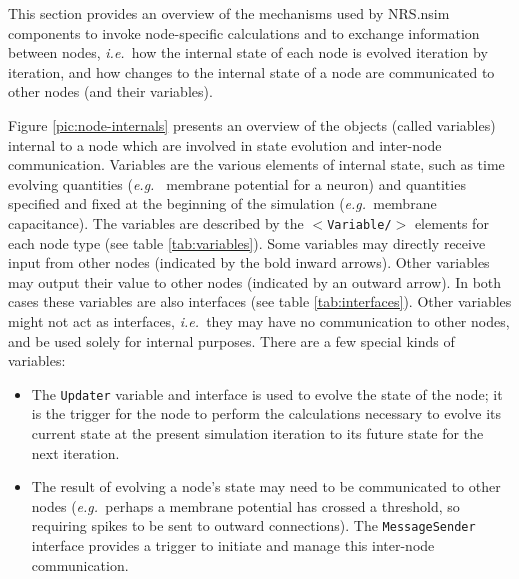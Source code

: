 \documentclass[pdftex,a4paper]{article}
\newif\ifpdf
\newcommand{\ie}{{\em i.e.\ }}
\newcommand{\eg}{{\em e.g.\ }}
\newcommand{\XML}[2][]{{\tt \small $<$#2#1/$>$}}
\begin{document}
This section provides an overview of the mechanisms used by NRS.nsim
components to invoke node-specific calculations and to exchange
information between nodes, \ie how the internal state of each node is
evolved iteration by iteration, and how changes to the internal state of
a node are communicated to other nodes (and their variables).

\ifpdf
\begin{figure}[htb]
  \begin{center}
    \texttt{[image: node-internals.pdf]}
    \caption{A node is essentially a collection of objects (called
    variables). This figure presents an internal view of a node, to
    illustrate those variables which play a significant role in the
    exchange of data between node elements. Those variables attached
    to bold arrows serve as interfaces to other nodes.}
    \label{pic:node-internals}
  \end{center}
\end{figure}
\fi


Figure \ref{pic:node-internals} presents an overview of the objects
(called variables) internal to a node which are involved in state
evolution and inter-node communication. Variables are the various
elements of internal state, such as time evolving quantities (\eg
membrane potential for a neuron) and quantities specified and fixed at
the beginning of the simulation (\eg membrane capacitance). The
variables are described by the \XML{Variable} elements for each node
type (see table \ref{tab:variables}). Some variables may directly
receive input from other nodes (indicated by the bold inward
arrows). Other variables may output their value to other nodes
(indicated by an outward arrow). In both cases these variables are
also interfaces (see table \ref{tab:interfaces}). Other variables
might not act as interfaces, \ie they may have no communication to
other nodes, and be used solely for internal purposes. There are a few
special kinds of variables:

\begin{itemize}

\item The {\tt Updater} variable and interface is used to evolve the
  state of the node; it is the trigger for the node to perform the
  calculations necessary to evolve its current state at the present
  simulation iteration to its future state for the next iteration.

\item The result of evolving a node's state may need to be communicated
  to other nodes (\eg perhaps a membrane potential has crossed a
  threshold, so requiring spikes to be sent to outward connections). The
  {\tt MessageSender} interface provides a trigger to initiate and
  manage this inter-node communication.

\end{itemize}
\end{document}
